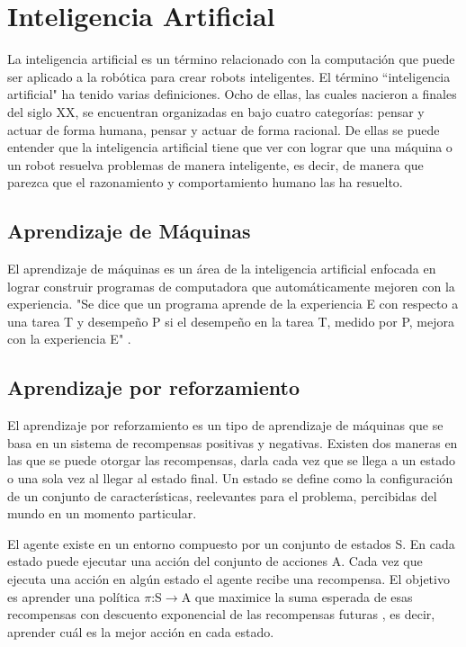 \section{Inteligencia Artificial} \label{sect:Inteligencia_Artificial}
La inteligencia artificial es un término relacionado con la computación que puede ser aplicado a la robótica para crear robots inteligentes. El término ``inteligencia artificial"\:
 ha tenido varias definiciones. Ocho de ellas, las cuales nacieron a finales del siglo XX, se encuentran organizadas en \cite{peterNorvig} bajo cuatro categorías: pensar y actuar de forma humana, pensar y actuar de forma racional. De ellas se puede entender que la inteligencia artificial tiene que ver con lograr que una máquina o un robot resuelva problemas de manera inteligente, es decir, de manera que parezca que el razonamiento y comportamiento humano las ha resuelto.  

\subsection{Aprendizaje de Máquinas}

El aprendizaje de máquinas es un área de la inteligencia artificial enfocada en lograr construir programas de computadora que automáticamente mejoren con la experiencia. "Se dice que un programa aprende de la experiencia E con respecto a una tarea T y desempeño P si el desempeño en la tarea T, medido por P, mejora con la experiencia E"  \cite{Mitchell}.

\subsection{Aprendizaje por reforzamiento}
El aprendizaje por reforzamiento es un tipo de aprendizaje de máquinas que se basa en un sistema de recompensas positivas y negativas. Existen dos maneras en las que se puede otorgar las recompensas, darla cada vez que se llega a un estado o una sola vez al llegar al estado final. Un estado se define como la configuraci\'on de un conjunto de características, reelevantes para el problema, percibidas del mundo en un momento particular.

El agente existe en un entorno compuesto por un conjunto de estados S. En cada estado puede ejecutar una acción del conjunto de acciones A. Cada vez que ejecuta una acción en algún estado el agente recibe una recompensa. El objetivo es aprender una política $\pi$:S$\to$A que maximice la suma esperada de esas recompensas con descuento exponencial de las recompensas futuras \cite{Mitchell}, es decir, aprender cuál es la mejor acción en cada estado.

